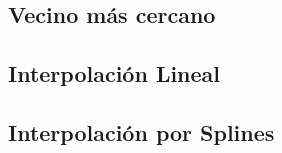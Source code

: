 \subsection{Vecino más cercano}



\subsection{Interpolación Lineal}



\subsection{Interpolación por Splines}

